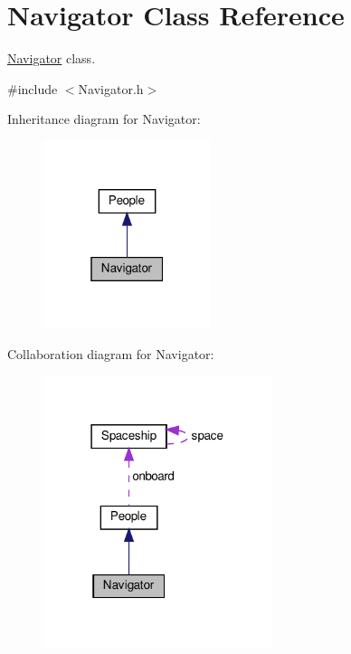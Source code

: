 \hypertarget{classNavigator}{}\section{Navigator Class Reference}
\label{classNavigator}


\hyperlink{classNavigator}{Navigator} class.  




{\ttfamily \#include $<$Navigator.\+h$>$}



Inheritance diagram for Navigator\+:\nopagebreak
\begin{figure}[H]
\begin{center}
\leavevmode
\includegraphics[width=139pt]{classNavigator__inherit__graph}
\end{center}
\end{figure}


Collaboration diagram for Navigator\+:\nopagebreak
\begin{figure}[H]
\begin{center}
\leavevmode
\includegraphics[width=190pt]{classNavigator__coll__graph}
\end{center}
\end{figure}
